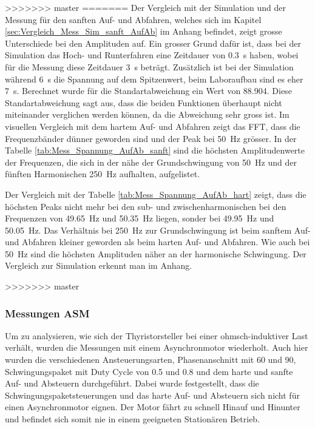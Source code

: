 >>>>>>> master
=======
Der Vergleich mit der Simulation und der Messung für den sanften Auf- und Abfahren, welches sich im Kapitel \ref{sec:Vergleich_Mess_Sim_sanft_AufAb} im Anhang befindet, zeigt grosse Unterschiede bei den Amplituden auf. Ein grosser Grund dafür ist, dass bei der Simulation das Hoch- und Runterfahren eine Zeitdauer von \SI{0.3}{s} haben, wobei für die Messung diese Zeitdauer \SI{3}{s} beträgt. Zusätzlich ist bei der Simulation während \SI{6}{s} die Spannung auf dem Spitzenwert, beim Laboraufbau sind es eher \SI{7}{s}.  Berechnet wurde für die Standartabweichung ein Wert von 88.904. Diese Standartabweichung sagt aus, dass die beiden Funktionen überhaupt nicht miteinander verglichen werden können, da die Abweichung sehr gross ist.
Im visuellen Vergleich mit dem hartem Auf- und Abfahren zeigt das FFT, dass die Frequenzbänder dünner geworden sind und der Peak bei \SI{50}{Hz} grösser. In der Tabelle \ref{tab:Mess_Spannung_AufAb_sanft} sind die höchsten Amplitudenwerte der Frequenzen, die sich in der nähe der Grundschwingung von \SI{50}{Hz} und der fünften Harmonischen \SI{250}{Hz} aufhalten, aufgelistet. 

Der Vergleich mit der Tabelle \ref{tab:Mess_Spannung_AufAb_hart} zeigt, dass die höchsten Peaks nicht mehr bei den sub- und zwischenharmonischen bei den Frequenzen von \SI{49.65}{Hz} und \SI{50.35}{Hz} liegen, sonder bei \SI{49.95}{Hz} und \SI{50.05}{Hz}. Das Verhältnis bei \SI{250}{Hz} zur Grundschwingung ist beim sanftem Auf- und Abfahren kleiner geworden als beim harten Auf- und Abfahren. Wie auch bei \SI{50}{Hz} sind die höchsten Amplituden näher an der harmonische Schwingung. Der Vergleich zur Simulation erkennt man im Anhang.

>>>>>>> master

\subsubsection{Messungen ASM}

Um zu analysieren, wie sich der Thyristorsteller bei einer ohmsch-induktiver Last verhält, wurden die Messungen mit einem Asynchronmotor wiederholt. Auch hier wurden die verschiedenen Ansteuerungsarten, Phasenanschnitt mit 60\textdegree \hspace{0.02cm} und 90\textdegree \hspace{0.02cm}, Schwingungspaket mit Duty Cycle von 0.5 und 0.8 und dem harte und sanfte Auf- und Absteuern durchgeführt. Dabei wurde festgestellt, dass die Schwingungspaketsteuerungen und das harte Auf- und Absteuern sich nicht für einen Asynchronmotor eignen. Der Motor fährt zu schnell Hinauf und Hinunter und befindet sich somit nie in einem geeigneten Stationären Betrieb. 

